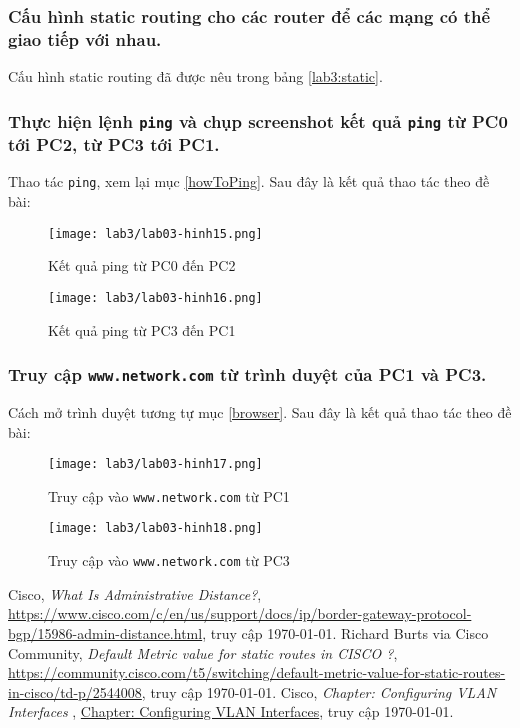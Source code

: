 \documentclass[]{article}
\begin{document}
\subsubsection{Cấu hình static routing cho các router để các mạng có thể giao tiếp với nhau.}
Cấu hình static routing đã được nêu trong bảng \ref{lab3:static}.
\subsubsection{Thực hiện lệnh \texttt{ping} và chụp screenshot kết quả \texttt{ping} từ PC0 tới PC2, từ PC3 tới PC1.}\label{lab3:resultPing}
Thao tác \texttt{ping}, xem lại mục \ref{howToPing}. Sau đây là kết quả thao tác theo đề bài:
\begin{figure}[H]
\centering
\texttt{[image: lab3/lab03-hinh15.png]}
\caption{Kết quả ping từ PC0 đến PC2}
\end{figure}
\begin{figure}[H]
\centering
\texttt{[image: lab3/lab03-hinh16.png]}
\caption{Kết quả ping từ PC3 đến PC1}
\end{figure}
\subsubsection{Truy cập \texttt{www.network.com} từ trình duyệt của PC1 và PC3.}\label{lab3:truyCapWeb}
Cách mở trình duyệt tương tự mục \ref{browser}. Sau đây là kết quả thao tác theo đề bài:
\begin{figure}[H]
\centering
\texttt{[image: lab3/lab03-hinh17.png]}
\caption{Truy cập vào \texttt{www.network.com} từ PC1}
\end{figure}
\begin{figure}[H]
\centering
\texttt{[image: lab3/lab03-hinh18.png]}
\caption{Truy cập vào \texttt{www.network.com} từ PC3}
\end{figure}
\begin{thebibliography}{10}
Cisco, \textit{What Is Administrative Distance?}, \href{https://www.cisco.com/c/en/us/support/docs/ip/border-gateway-protocol-bgp/15986-admin-distance.html}{https://www.cisco.com/c/en/us/support/docs/ip/border-gateway-protocol-bgp/15986-admin-distance.html}, truy cập \today.
Richard Burts via Cisco Community, \textit{Default Metric value for static routes in CISCO ?}, \href{https://community.cisco.com/t5/switching/default-metric-value-for-static-routes-in-cisco/td-p/2544008}{https://community.cisco.com/t5/switching/default-metric-value-for-static-routes-in-cisco/td-p/2544008}, truy cập \today.
Cisco, \textit{Chapter: Configuring VLAN Interfaces }, \href{https://www.cisco.com/c/en/us/td/docs/app\_ntwk\_services/data\_center\_app_services/ace\_appliances/vA1\_7\_/configuration/routing\_bridging/guide/rtbrgdgd/vlansif.html}{Chapter: Configuring VLAN Interfaces}, truy cập \today.
\end{thebibliography}
\end{document}
